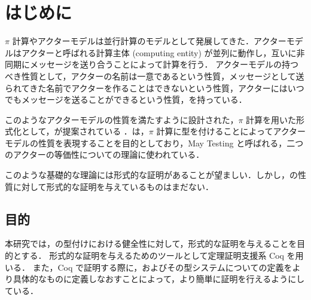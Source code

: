 \section{はじめに}

 $ \pi $ 計算やアクターモデルは並行計算のモデルとして発展してきた．アクターモデルはアクターと呼ばれる計算主体 (computing entity) が並列に動作し，互いに非同期にメッセージを送り合うことによって計算を行う．
アクターモデルの持つべき性質として，アクターの名前は一意であるという性質，メッセージとして送られてきた名前でアクターを作ることはできないという性質，アクターにはいつでもメッセージを送ることができるという性質，を持っている．

このようなアクターモデルの性質を満たすように設計された，$\pi$ 計算を用いた形式化として，\api が提案されている\cite[Dean2008]{Agha:2004aa} ．\api は，$\pi$ 計算に型を付けることによってアクターモデルの性質を表現することを目的としており，May Testing と呼ばれる，二つのアクターの等価性についての理論に使われている．


このような基礎的な理論には形式的な証明があることが望ましい．しかし，\api の性質に対して形式的な証明を与えているものはまだない．


\subsection{目的}

本研究では，\api の型付けにおける健全性に対して，形式的な証明を与えることを目的とする．
形式的な証明を与えるためのツールとして定理証明支援系 Coq を用いる．
また，Coq で証明する際に，\api およびその型システムについての定義をより具体的なものに定義しなおすことによって，より簡単に証明を行えるようにしている．






